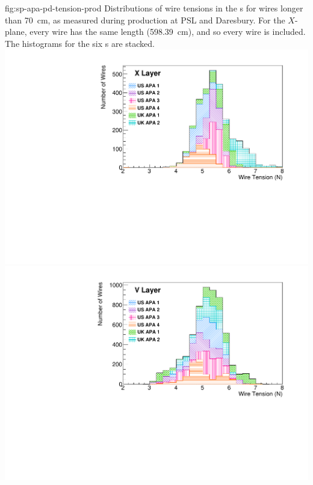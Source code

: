 \begin{dunefigure}{fig:sp-apa-pd-tension-prod}
{Distributions of wire tensions in the  s for wires longer than \SI{70}{cm}, as measured during production at PSL and Daresbury. For the $X$-plane, every wire has the same length (\SI{598.39}{cm}), and so every wire is included.  
The histograms for the six s are stacked. 
}
\includegraphics[height=0.28\textheight,trim=0mm 0mm 0mm 0mm,clip]{graphics/sp-apa-X-layer-tensions.pdf}
\includegraphics[height=0.28\textheight,trim=0mm 0mm 0mm 0mm,clip]{graphics/sp-apa-V-layer-tensions.pdf}

\end{dunefigure}
